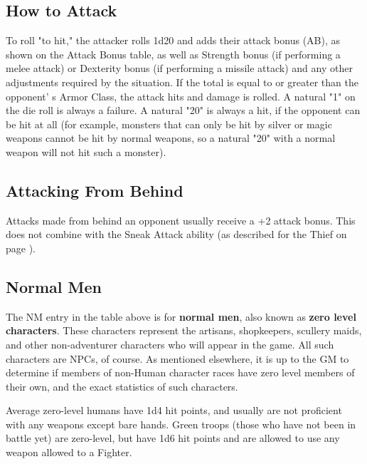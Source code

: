 \documentclass[a4paper,twoside,openany,10pt]{book}
\begin{document}
\begin{multicols}{2}
	


\subsection{How to Attack}\label{how-to-attack}

To roll "to hit," the attacker rolls 1d20 and adds their attack bonus (AB), as shown on the Attack Bonus table, as well as Strength bonus (if performing a melee attack) or Dexterity bonus (if performing a missile attack) and any other adjustments required by the situation. If the total is equal to or greater than the opponent' s Armor Class, the attack hits and damage is rolled. A natural "1" on the die roll is always a failure. A natural "20" is always a hit, if the opponent can be hit at all (for example, monsters that can only be hit by silver or magic weapons cannot be hit by normal weapons, so a natural "20" with a normal weapon will not hit such a monster).

\subsection{Attacking From Behind}\label{attacking-from-behind}

Attacks made from behind an opponent usually receive a +2 attack bonus. This does not combine with the Sneak Attack ability (as described for the Thief on page \hyperlink{attacking-from-behind}{\pageref{attacking-from-behind}}).

\subsection{Normal Men}\label{normal-men}

The NM entry in the table above is for \textbf{normal men}, also known as \textbf{zero level characters}. These characters represent the artisans, shopkeepers, scullery maids, and other non-adventurer characters who will appear in the game. All such characters are NPCs, of course. As mentioned elsewhere, it is up to the GM to determine if members of non-Human character races have zero level members of their own, and the exact statistics of such characters.

Average zero-level humans have 1d4 hit points, and usually are not proficient with any weapons except bare hands. Green troops (those who have not been in battle yet) are zero-level, but have 1d6 hit points and are allowed to use any weapon allowed to a Fighter.


\end{multicols}
\end{document}
